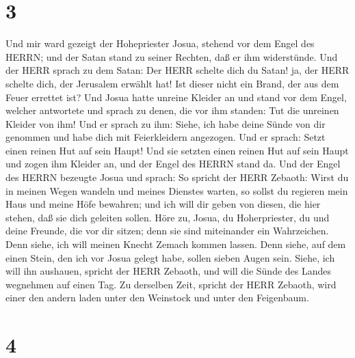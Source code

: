 \hypertarget{section-2}{%
\section{3}\label{section-2}}

 Und mir ward gezeigt der Hohepriester Josua, stehend vor
dem Engel des HERRN; und der Satan stand zu seiner Rechten, daß er ihm
widerstünde.  Und der HERR sprach zu dem Satan: Der HERR
schelte dich du Satan! ja, der HERR schelte dich, der Jerusalem erwählt
hat! Ist dieser nicht ein Brand, der aus dem Feuer errettet ist?
 Und Josua hatte unreine Kleider an und stand vor dem Engel,
 welcher antwortete und sprach zu denen, die vor ihm
standen: Tut die unreinen Kleider von ihm! Und er sprach zu ihm: Siehe,
ich habe deine Sünde von dir genommen und habe dich mit Feierkleidern
angezogen.  Und er sprach: Setzt einen reinen Hut auf sein
Haupt! Und sie setzten einen reinen Hut auf sein Haupt und zogen ihm
Kleider an, und der Engel des HERRN stand da.  Und der Engel
des HERRN bezeugte Josua und sprach:  So spricht der HERR
Zebaoth: Wirst du in meinen Wegen wandeln und meines Dienstes warten, so
sollst du regieren mein Haus und meine Höfe bewahren; und ich will dir
geben von diesen, die hier stehen, daß sie dich geleiten sollen.
 Höre zu, Josua, du Hoherpriester, du und deine Freunde, die
vor dir sitzen; denn sie sind miteinander ein Wahrzeichen. Denn siehe,
ich will meinen Knecht Zemach kommen lassen.  Denn siehe,
auf dem einen Stein, den ich vor Josua gelegt habe, sollen sieben Augen
sein. Siehe, ich will ihn aushauen, spricht der HERR Zebaoth, und will
die Sünde des Landes wegnehmen auf einen Tag.  Zu derselben
Zeit, spricht der HERR Zebaoth, wird einer den andern laden unter den
Weinstock und unter den Feigenbaum.

\hypertarget{section-3}{%
\section{4}\label{section-3}}

